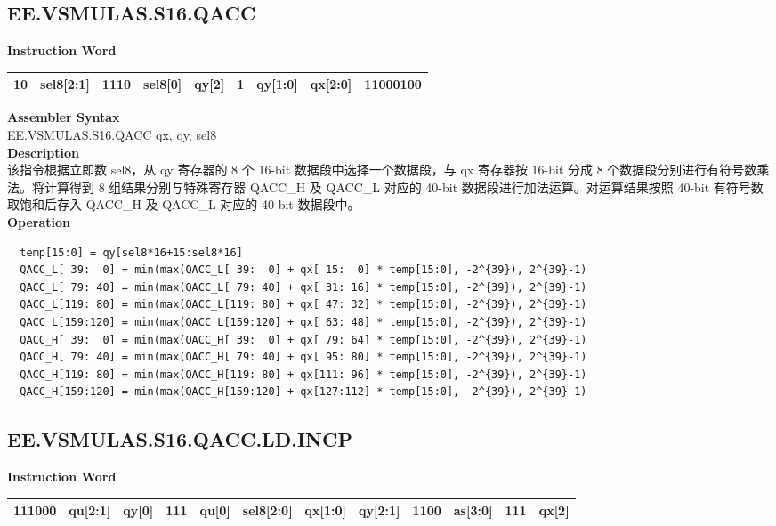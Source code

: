\clearpage
\subsection{EE.VSMULAS.S16.QACC}\label{instruction:EEVSMULASS16QACC}
\setlength\tabcolsep{6pt}
\textbf{Instruction Word} \\
\begin{tabular}{|c|c|c|c|c|c|c|c|c|}
	\hline
	10 & sel8[2:1] & 1110 & sel8[0] & qy[2] & 1 & qy[1:0] & qx[2:0] & 11000100 \\
	\hline
\end{tabular}

\textbf{Assembler Syntax} \\
EE.VSMULAS.S16.QACC qx, qy, sel8 \\
\textbf{Description} \\
该指令根据立即数 sel8，从 qy 寄存器的 8 个 16-bit 数据段中选择一个数据段，与 qx 寄存器按 16-bit 分成 8 个数据段分别进行有符号数乘法。将计算得到 8 组结果分别与特殊寄存器 QACC\_H 及 QACC\_L 对应的 40-bit 数据段进行加法运算。对运算结果按照 40-bit 有符号数取饱和后存入 QACC\_H 及 QACC\_L 对应的 40-bit 数据段中。\\
\textbf{Operation}
\begin{lstlisting}
  temp[15:0] = qy[sel8*16+15:sel8*16]
  QACC_L[ 39:  0] = min(max(QACC_L[ 39:  0] + qx[ 15:  0] * temp[15:0], -2^{39}), 2^{39}-1)
  QACC_L[ 79: 40] = min(max(QACC_L[ 79: 40] + qx[ 31: 16] * temp[15:0], -2^{39}), 2^{39}-1)
  QACC_L[119: 80] = min(max(QACC_L[119: 80] + qx[ 47: 32] * temp[15:0], -2^{39}), 2^{39}-1)
  QACC_L[159:120] = min(max(QACC_L[159:120] + qx[ 63: 48] * temp[15:0], -2^{39}), 2^{39}-1)
  QACC_H[ 39:  0] = min(max(QACC_H[ 39:  0] + qx[ 79: 64] * temp[15:0], -2^{39}), 2^{39}-1)
  QACC_H[ 79: 40] = min(max(QACC_H[ 79: 40] + qx[ 95: 80] * temp[15:0], -2^{39}), 2^{39}-1)
  QACC_H[119: 80] = min(max(QACC_H[119: 80] + qx[111: 96] * temp[15:0], -2^{39}), 2^{39}-1)
  QACC_H[159:120] = min(max(QACC_H[159:120] + qx[127:112] * temp[15:0], -2^{39}), 2^{39}-1)
\end{lstlisting}

\clearpage
\subsection{EE.VSMULAS.S16.QACC.LD.INCP}\label{instruction:EEVSMULASS16QACCLDINCP}
\setlength\tabcolsep{6pt}
\textbf{Instruction Word} \\
\begin{tabular}{|c|c|c|c|c|c|c|c|c|c|c|c|}
	\hline
	111000 & qu[2:1] & qy[0] & 111 & qu[0] & sel8[2:0] & qx[1:0] & qy[2:1] & 1100 & as[3:0] & 111 & qx[2] \\
	\hline
\end{tabular}

